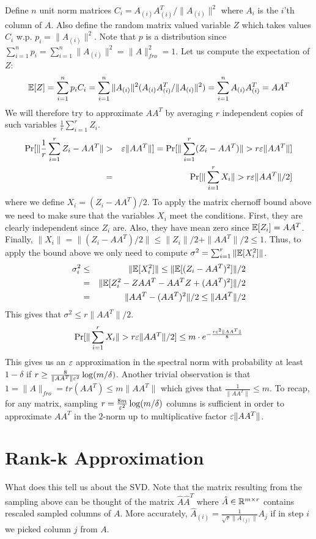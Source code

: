 \documentclass{article}
\begin{document}
Define $n$ unit norm matrices $C_i = A_{(i)}A_{(i)}^T/\|A_{(i)}\|^2$ where $A_{i}$ is the $i$'th column of $A$.
Also define the random matrix valued variable $Z$ which takes values $C_i$ w.p. $p_i = \|A_{(i)}\|^2$.
Note that $p$ is a distribution since $\sum_{i=1}^{n}p_i = \sum_{i=1}^{n}\|A_{(i)}\|^2 = \|A\|_{fro}^2 = 1$.
Let us compute the expectation of $Z$:
\[
{\mathbb E}[Z] = \sum_{i=1}^{n}p_i C_i = \sum_{i=1}^{n}  \|A_{(i)}\|^2 (A_{(i)}A_{(i)}^T/\|A_{(i)}\|^2) =  \sum_{i=1}^{n} A_{(i)}A_{(i)}^T = AA^T
\]
We will therefore try to approximate $AA^T$ by averaging $r$ independent copies of such variables $\frac{1}{r}\sum_{i=1}^{r}Z_i$.
\begin{eqnarray}
\Pr[ \| \frac{1}{r}\sum_{i=1}^{r}Z_i - AA^T \| &>& \varepsilon\|AA^T \|] = \Pr[ \| \sum_{i=1}^{r}(Z_i - AA^T) \| > r\varepsilon\|AA^T \|] \\
&=& \Pr[ \| \sum_{i=1}^{r}X_i \| > r\varepsilon\|AA^T \|/2]
\end{eqnarray}
where we define $X_i = (Z_i - AA^T)/2$. To apply the matrix chernoff bound above we need to make sure that the variables $X_i$
meet the conditions. First, they are clearly independent since $Z_i$ are. Also, they have mean zero since ${\mathbb E}[Z_i] = AA^T$.
Finally, $\|X_i\| = \|(Z_i - AA^T)/2\| \le \|Z_i\|/2 + \|AA^T\|/2 \le 1$.
Thus, to apply the bound above we only need to compute $\sigma^2 = \sum_{i=1}^{r} \|{\mathbb E} [X^2_i] \|$.
\begin{eqnarray}
\sigma^2_i &\le& \|{\mathbb E} [X^2_i] \| \le \|{\mathbb E} [ (Z_i - AA^T)^2 ]\|/2 \\
&=&  \|{\mathbb E} [ Z^2_i - ZAA^T -  AA^TZ + (AA^T)^2]\|/2 \\
&=& \| AA^T - (AA^T)^2 \|/2 \le \|AA^T\|/2
\end{eqnarray}
This gives that $\sigma^2 \le r\|AA^T\|/2$.
\[
 \Pr[ \| \sum_{i=1}^{r}X_i \| > r\varepsilon\|AA^T\|/2] \le m \cdot e^{- \frac{r\varepsilon^2\|AA^T\|}{8}}
\]
This gives us an $\varepsilon$ approximation in the spectral norm with probability at least $1-\delta$ if $r \ge \frac{8 }{\|AA^T\| \varepsilon^2}\log(m/\delta)$.
Another trivial observation is that $1 = \|A\|_{fro}=tr(AA^T) \le m \|AA^T\|$  which gives that $\frac{1}{\|AA^T\|} \le m$.
To recap, for any matrix, sampling $r = \frac{8m }{\varepsilon^2}\log(m/\delta)$ columns is sufficient in order to approximate
 $AA^T$ in the $2$-norm up to multiplicative factor $\varepsilon\|AA^T\|$.



\section{Rank-k Approximation}
What does this tell us about the SVD. Note that the matrix resulting from the sampling above can be thought 
of the matrix $\hat{A}\hat{A}^T$ where $\hat{A} \in {\mathbb{R}}^{m\times r}$ contains rescaled sampled columns of $A$.
More accurately, $\hat{A}_{(i)} = \frac{1}{\sqrt{r}\|A_{(j)}\|}A_{j}$ if in step $i$ we picked column $j$ from $A$.
\end{document}
